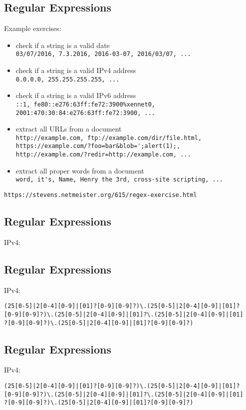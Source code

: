 \documentclass[xga]{xdvislides}
\begin{document}
\subsection{Regular Expressions}
Example exercises:
\begin{itemize}
	\item check if a string is a valid date \\
		\verb+03/07/2016, 7.3.2016, 2016-03-07, 2016/03/07, ...+
	\item check if a string is a valid IPv4 address \\
		\verb+0.0.0.0, 255.255.255.255, ...+
	\item check if a string is a valid IPv6 address \\
		\verb+::1, fe80::e276:63ff:fe72:3900%xennet0, 2001:470:30:84:e276:63ff:fe72:3900, ...+
	\item extract all URLs from a document \\
		\verb+http://example.com, ftp://example.com/dir/file.html,+ \\
		\verb+https://example.com/?foo=bar&blob=';alert(1);,+ \\
		\verb+http://example.com/?redir=http://example.com, ...+
	\item extract all proper words from a document \\
		\verb+word, it's, Name, Henry the 3rd, cross-site scripting, ...+
\end{itemize}
\vspace{.25in}
\verb+https://stevens.netmeister.org/615/regex-exercise.html+

\subsection{Regular Expressions}
IPv4:

\subsection{Regular Expressions}
IPv4:
\begin{verbatim}
(25[0-5]|2[0-4][0-9]|[01]?[0-9][0-9]?)\.(25[0-5]|2[0-4][0-9]|[01]?
[0-9][0-9]?)\.(25[0-5]|2[0-4][0-9]|[01]?\.(25[0-5]|2[0-4][0-9]|[01]
?[0-9][0-9]?)\.(25[0-5]|2[0-4][0-9]|[01]?[0-9][0-9]?)
\end{verbatim}

\subsection{Regular Expressions}
IPv4:
\begin{verbatim}
(25[0-5]|2[0-4][0-9]|[01]?[0-9][0-9]?)\.(25[0-5]|2[0-4][0-9]|[01]?
[0-9][0-9]?)\.(25[0-5]|2[0-4][0-9]|[01]?\.(25[0-5]|2[0-4][0-9]|[01]
?[0-9][0-9]?)\.(25[0-5]|2[0-4][0-9]|[01]?[0-9][0-9]?)
\end{verbatim}
\end{document}
